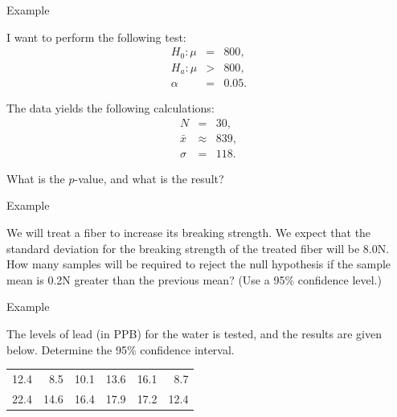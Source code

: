 \begin{frame}{Example}

  I want to perform the following test:
  \begin{eqnarray*}
    H_0: \mu & = & 800, \\
    H_a: \mu & > & 800, \\
    \alpha & = & 0.05.
  \end{eqnarray*}

  The data yields the following calculations:
  \begin{eqnarray*}
    N & = & 30, \\
    \bar{x} & \approx & 839, \\
    \sigma & = & 118.
  \end{eqnarray*}

  What is the $p$-value, and what is the result?

  \vfill 

  
\end{frame}


\begin{frame}{Example}

  We will treat a fiber to increase its breaking strength. We expect
  that the standard deviation for the breaking strength of the treated
  fiber will be 8.0N. How many samples will be required to reject the
  null hypothesis if the sample mean is 0.2N greater than the previous
  mean? (Use a 95\% confidence level.)

  \vfill


  \vfill
  
\end{frame}

\begin{frame}{Example}

  The levels of lead (in PPB) for the water is tested, and the results
  are given below. Determine the 95\% confidence interval.

\begin{tabular}{rrrrrr}
  12.4  & 8.5  & 10.1 & 13.6 & 16.1 & 8.7 \\
  22.4  & 14.6 & 16.4 & 17.9 & 17.2 & 12.4
\end{tabular}


\vfill


  
\end{frame}


